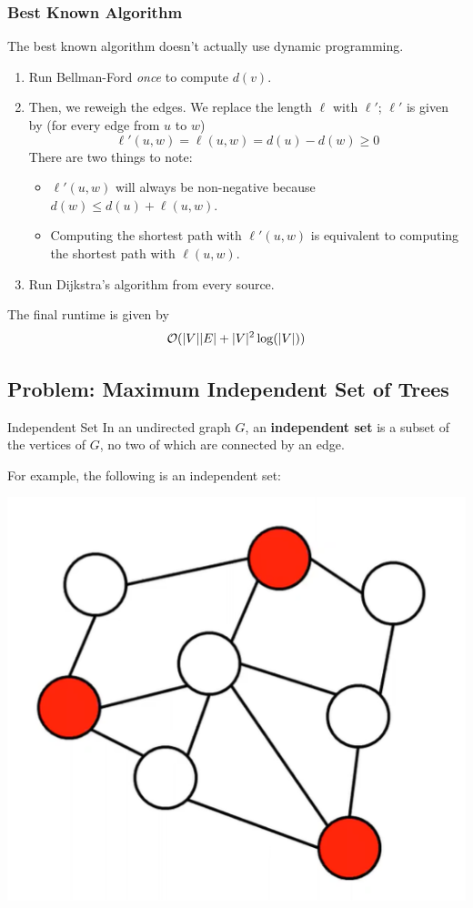 \documentclass[letterpaper]{article}
\begin{document}
\subsubsection{Best Known Algorithm}
The best known algorithm doesn't actually use dynamic programming. 
\begin{enumerate}
    \item Run Bellman-Ford \emph{once} to compute $d(v)$. 
    \item Then, we reweigh the edges. We replace the length $\ell$ with $\ell'$; $\ell'$ is given by (for every edge from $u$ to $w$)
    \[\ell'(u, w) = \ell(u, w) = d(u) - d(w) \geq 0\]
    There are two things to note: 
    \begin{itemize}
        \item $\ell'(u, w)$ will always be non-negative because $d(w) \leq d(u) + \ell(u, w)$. 
        \item Computing the shortest path with $\ell'(u, w)$ is equivalent to computing the shortest path with $\ell(u, w)$. 
    \end{itemize}
    
    \item Run Dijkstra's algorithm from every source. 
\end{enumerate}
The final runtime is given by 
\[\mathcal{O}(|V||E| + |V|^2 \log(|V|))\]

\subsection{Problem: Maximum Independent Set of Trees}

\begin{definition}{Independent Set}{}
    In an undirected graph $G$, an \textbf{independent set} is a subset of the vertices of $G$, no two of which are connected by an edge.
\end{definition}
For example, the following is an independent set:
\begin{center}
    \includegraphics[scale=0.3]{assets/ind_set.png}
\end{center}
\end{document}
